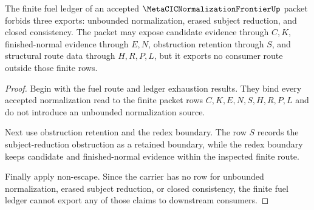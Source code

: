 \begin{theorem}
\label{thm:metacic-normalization-frontier-fuel-ledger-nonescape}
The finite fuel ledger of an accepted $\MetaCICNormalizationFrontierUp$ packet forbids three exports: unbounded normalization, erased subject reduction, and closed consistency. The packet may expose candidate evidence through $C,K$, finished-normal evidence through $E,N$, obstruction retention through $S$, and structural route data through $H,R,P,L$, but it exports no consumer route outside those finite rows.
\end{theorem}
\begin{proof}
Begin with the fuel route and ledger exhaustion results. They bind every accepted normalization read to the finite packet rows $C,K,E,N,S,H,R,P,L$ and do not introduce an unbounded normalization source.

Next use obstruction retention and the redex boundary. The row $S$ records the subject-reduction obstruction as a retained boundary, while the redex boundary keeps candidate and finished-normal evidence within the inspected finite route.

Finally apply non-escape. Since the carrier has no row for unbounded normalization, erased subject reduction, or closed consistency, the finite fuel ledger cannot export any of those claims to downstream consumers.
\end{proof}
